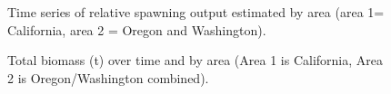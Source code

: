 \documentclass[
]{scrartcl}
\begin{document}
\begin{figure}


\caption{\label{fig-status_area}Time series of relative spawning output
estimated by area (area 1= California, area 2 = Oregon and Washington).}

\end{figure}%

\begin{figure}


\caption{\label{fig-totalbio}Total biomass (t) over time and by area
(Area 1 is California, Area 2 is Oregon/Washington combined).}

\end{figure}%
\end{document}
